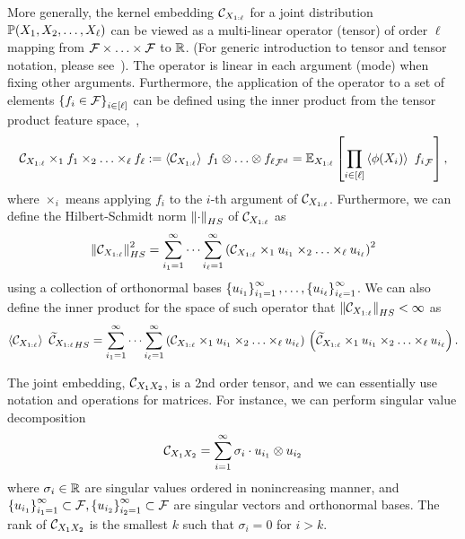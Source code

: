 \documentclass[11pt]{article}
\begin{document}
More generally, the kernel embedding $\mathcal{C}_{X_{1:\ell}}$ for a joint distribution $\mathbb{P}(X_1,X_2,\ldots,X_{\ell})$ can be viewed as a multi-linear operator (tensor) of order $\ell$ mapping from $\mathcal{F}\times\ldots\times \mathcal{F}$ to $\mathbb{R}$. (For generic introduction to tensor and tensor notation, please see~\cite{KolBad09}). The operator is linear in each argument (mode) when fixing other arguments. Furthermore, the application of the operator to a set of elements $\left\{f_i \in \mathcal{F}\right\}_{i \in [\ell]}$ can be defined using the inner product from the tensor product feature space,~\ie,
\begin{align}
	\mathcal{C}_{X_{1:\ell}} \times_1 f_1 \times_2 \ldots \times_\ell f_\ell := 	\left<\mathcal{C}_{X_{1:\ell}}\right>{\;f_1\otimes\ldots\otimes f_\ell}_{\mathcal{F}^d}=\mathbb{E}_{X_{1:\ell}}\left[\prod_{i \in [\ell]} \left<\phi(X_i)\right>{~f_i}_{\mathcal{F}}\right],
\end{align}
where $\times_i$ means applying $f_i$ to the $i$-th argument of $\mathcal{C}_{X_{1:\ell}}$. Furthermore, we can define the Hilbert-Schmidt norm $\left\|\cdot\right\|_{HS}$ of $\mathcal{C}_{X_{1:\ell}}$ as
\[
 \left\|\mathcal{C}_{X_{1:\ell}}\right\|_{HS}^2 = \sum_{i_1 = 1}^\infty \cdots \sum_{i_\ell = 1}^\infty \left(\mathcal{C}_{X_{1:\ell}} \times_1 u_{i_1} \times_2 \ldots \times_\ell u_{i_\ell}\right)^2
\]
using a collection of orthonormal bases $\left\{u_{i_1}\right\}_{i_1=1}^\infty, \ldots, \left\{u_{i_\ell}\right\}_{i_\ell=1}^\infty$. We can also define the inner product for the space of such operator that $\left\|\mathcal{C}_{X_{1:\ell}}\right\|_{HS}<\infty$ as
\begin{align}
	\left<\mathcal{C}_{X_{1:\ell}}\right>{~\widetilde{\mathcal{C}}_{X_{1:\ell}}}_{HS}  =  \sum_{i_1 = 1}^\infty \cdots \sum_{i_\ell = 1}^\infty \left(\mathcal{C}_{X_{1:\ell}} \times_1 u_{i_1} \times_2 \ldots \times_\ell u_{i_\ell}\right)\, \left(\widetilde{\mathcal{C}}_{X_{1:\ell}} \times_1 u_{i_1} \times_2 \ldots \times_\ell u_{i_\ell}\right).
\end{align}


The joint embedding, $\mathcal{C}_{X_1 X_2}$, is a 2nd order tensor, and we can essentially use notation and operations for matrices. For instance, we can perform singular value decomposition
\[
    \mathcal{C}_{X_1X_2} = \sum_{i=1}^{\infty} \sigma_i \cdot u_{i_1} \otimes u_{i_2}
\]
where $\sigma_i \in \mathbb{R}$ are singular values ordered in nonincreasing manner, and $\left\{u_{i_1}\right\}_{i_1=1}^{\infty} \subset \mathcal{F}, \left\{u_{i_2}\right\}_{i_2=1}^{\infty} \subset \mathcal{F}$ are singular vectors and orthonormal bases. The rank of $\mathcal{C}_{X_1X_2}$ is the smallest $k$ such that $\sigma_i = 0$ for $i > k$. 
\end{document}
